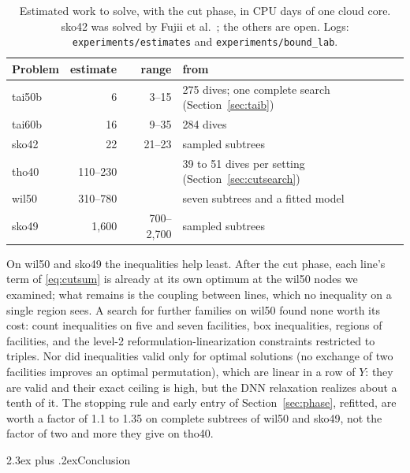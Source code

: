 \documentclass[10pt]{article}
\makeatletter
\renewcommand\section{\@startsection{section}{1}{\z@}{-3.5ex plus -1ex minus -.2ex}%
  {2.3ex plus .2ex}{\normalfont\normalsize\bfseries}}
\theoremstyle{remark}
\makeatother
\begin{document}
\begin{table}[t]\centering
\caption{Estimated work to solve, with the cut phase, in CPU days of one cloud core.
sko42 was solved by Fujii et al.\ \cite{fujii}; the others are open. Logs:
\texttt{experiments/estimates} and
\texttt{experiments/bound\_lab}.}\label{tab:estimates}
\small\setlength{\tabcolsep}{4pt}
\begin{tabular}{lrrl}
\toprule
Problem & estimate & range & from\\
\midrule
tai50b & 6 & 3--15 & 275 dives; one complete search (Section~\ref{sec:taib})\\
tai60b & 16 & 9--35 & 284 dives\\
sko42 & 22 & 21--23 & sampled subtrees\\
tho40 & 110--230 & & 39 to 51 dives per setting (Section~\ref{sec:cutsearch})\\
wil50 & 310--780 & & seven subtrees and a fitted model\\
sko49 & 1,600 & 700--2,700 & sampled subtrees\\
\bottomrule
\end{tabular}
\end{table}

On wil50 and sko49 the inequalities help least. After the cut phase, each line's
term of \eqref{eq:cutsum} is already at its own optimum at the wil50 nodes we
examined; what remains is the coupling between lines, which no inequality on a
single region sees. A search for further families on wil50 found none worth its
cost: count inequalities on five and seven facilities, box inequalities,
regions of facilities, and the level-2 reformulation-linearization constraints
restricted to triples. Nor did inequalities valid only for optimal solutions (no
exchange of two facilities improves an optimal permutation), which are linear in a
row of $Y$: they are valid and their exact ceiling is high, but the DNN relaxation
realizes about a tenth of it. The stopping rule and early entry of
Section~\ref{sec:phase}, refitted, are worth a factor of 1.1 to 1.35 on complete
subtrees of wil50 and sko49, not the factor of two and more they give on tho40.

\section{Conclusion}
\end{document}
